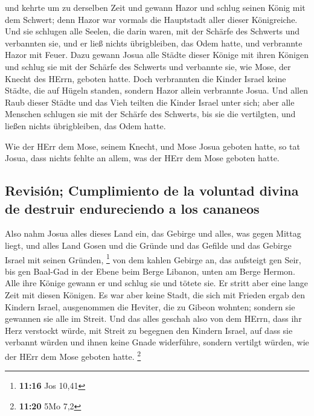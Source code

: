  und kehrte um zu derselben Zeit und gewann Hazor und
schlug seinen König mit dem Schwert; denn Hazor war vormals die
Hauptstadt aller dieser Königreiche.  Und sie schlugen
alle Seelen, die darin waren, mit der Schärfe des Schwerts und
verbannten sie, und er ließ nichts übrigbleiben, das Odem hatte, und
verbrannte Hazor mit Feuer.  Dazu gewann Josua alle
Städte dieser Könige mit ihren Königen und schlug sie mit der Schärfe
des Schwerts und verbannte sie, wie Mose, der Knecht des HErrn, geboten
hatte.  Doch verbrannten die Kinder Israel keine Städte,
die auf Hügeln standen, sondern Hazor allein verbrannte Josua.
 Und allen Raub dieser Städte und das Vieh teilten die
Kinder Israel unter sich; aber alle Menschen schlugen sie mit der
Schärfe des Schwerts, bis sie die vertilgten, und ließen nichts
übrigbleiben, das Odem hatte.

 Wie der HErr dem Mose, seinem Knecht, und Mose Josua
geboten hatte, so tat Josua, dass nichts fehlte an allem, was der HErr
dem Mose geboten hatte.

\hypertarget{revisiuxf3n-cumplimiento-de-la-voluntad-divina-de-destruir-endureciendo-a-los-cananeos}{%
\subsection{Revisión; Cumplimiento de la voluntad divina de destruir
endureciendo a los
cananeos}\label{revisiuxf3n-cumplimiento-de-la-voluntad-divina-de-destruir-endureciendo-a-los-cananeos}}

 Also nahm Josua alles dieses Land ein, das Gebirge und
alles, was gegen Mittag liegt, und alles Land Gosen und die Gründe und
das Gefilde und das Gebirge Israel mit seinen Gründen, \footnote{\textbf{11:16}
  Jos 10,41}  von dem kahlen Gebirge an, das aufsteigt
gen Seir, bis gen Baal-Gad in der Ebene beim Berge Libanon, unten am
Berge Hermon. Alle ihre Könige gewann er und schlug sie und tötete sie.
 Er stritt aber eine lange Zeit mit diesen Königen.
 Es war aber keine Stadt, die sich mit Frieden ergab den
Kindern Israel, ausgenommen die Heviter, die zu Gibeon wohnten; sondern
sie gewannen sie alle im Streit.  Und das alles geschah
also von dem HErrn, dass ihr Herz verstockt würde, mit Streit zu
begegnen den Kindern Israel, auf dass sie verbannt würden und ihnen
keine Gnade widerführe, sondern vertilgt würden, wie der HErr dem Mose
geboten hatte. \footnote{\textbf{11:20} 5Mo 7,2}

